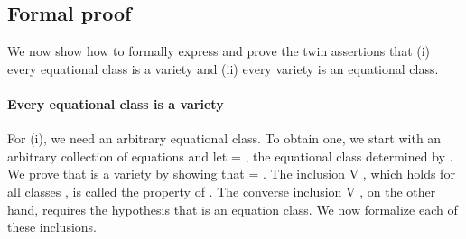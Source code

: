 \subsection{Formal proof}
We now show how to formally express and prove the twin assertions that
(i) every equational class is a variety and (ii) every variety is an equational class.

\paragraph*{Every equational class is a variety}
For (i), we need an arbitrary equational class. To obtain one, we start with an arbitrary
collection  of equations and let  =  , the equational class
determined by . We prove that  is a variety by showing that
 =  . The inclusion   \af V , which holds for all
classes , is called the  property of . The converse inclusion
\af V   , on the other hand, requires the hypothesis that  is an
equation class. We now formalize each of these inclusions.


